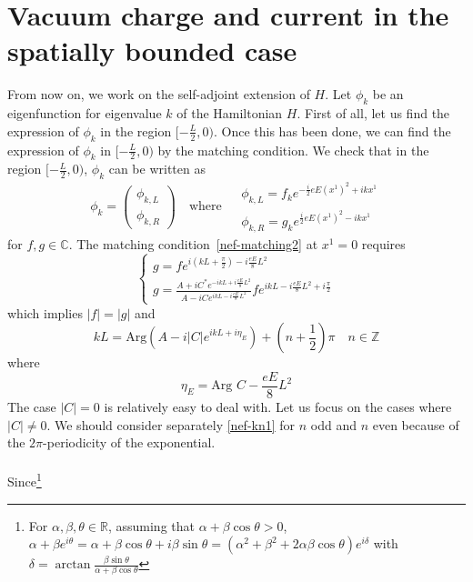 \section{Vacuum charge and current in the spatially bounded case}
From now on, we work on the self-adjoint extension of $H$.
Let $\phi_k$ be an eigenfunction for eigenvalue $k$ of the Hamiltonian $H$. 
First of all, 
let us find the expression of $\phi_k$ in the region $[-\frac{L}{2}, 0)$.
Once this has been done, 
we can find the expression of $\phi_k$ in $[-\frac L 2, 0)$ by the matching condition.
We check that in the region $[-\frac{L}{2}, 0)$, 
$\phi_k$ can be written as 
\begin{equation}\label{nef-boundCond}
\phi_k =\begin{pmatrix}
\phi_{k,L}  \\
\phi_{k,R}
\end{pmatrix} 
\quad \textrm{where $\begin{split} 
 & \phi_{k,L} = f_k e^{-\frac{i}{2}eE(x^1)^2 + ikx^1} \\
& \phi_{k,R} = g_k e^{\frac{i}{2}eE(x^1)^2 - ikx^1}
\end{split}
$}
\end{equation}
for $f, g\in \mathbb{C}$. 
The matching condition~\cref{nef-matching2} at $x^1 = 0$ requires
\begin{equation}
\begin{cases}
g = fe^{i(kL + \frac{\pi}{2}) - i\frac{eE}{8}L^2}  \\
g = \frac{A + iC^* e^{-ikL + i\frac{eE}{8}L^2 }}{A - iC e^{ikL - i\frac{eE}{8}L^2}} fe^{ikL - i\frac{eE}{8}L^2 + i\frac{\pi}{2}}
\end{cases}
\end{equation}
which implies $|f| = |g|$ and
\begin{equation}\label{nef-kn1}
kL = \textrm{Arg}(A - i|C| e^{ikL + i\eta_E}) + (n + \frac{1}{2})\pi \quad n\in \mathbb{Z}
\end{equation}
where
\begin{equation*}
\eta_E = \textrm{Arg } C - \frac{eE}{8}L^2 
\end{equation*}
The case $|C| =0$ is relatively easy to deal with. Let us focus on the cases where $|C| \neq 0$. We should consider separately \cref{nef-kn1} for $n$ odd and $n$ even because of the $2\pi$-periodicity of the exponential. \\\\
Since\footnote{
For $\alpha, \beta, \theta \in \mathbb{R}$, assuming that $\alpha + \beta \cos \theta > 0$, $\alpha + \beta e^{i \theta} = \alpha + \beta \cos \theta + i\beta \sin \theta = (\alpha^2 + \beta^2 + 2\alpha \beta \cos \theta) e^{i \delta}$ with $\delta = \arctan \frac{\beta\sin\theta}{\alpha + \beta\cos\theta}$  
} 
